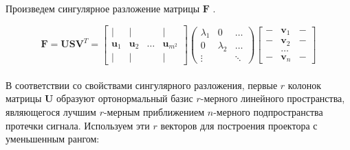 Произведем сингулярное разложение матрицы $\mathbf{F}$ \cite{Golub1996}.

\begin{equation}
    \mathbf{F} = \mathbf{USV}^T
    =
    \begin{bmatrix}
        |            & |            &        & |       \\
        \mathbf{u}_1 & \mathbf{u}_2 & \dots  & \mathbf{u}_{m^2} \\
        |            & |            &        & |
    \end{bmatrix}
    \begin{pmatrix}
        \lambda_1 & 0         & \dots    \\
        0         & \lambda_2 & \dots    \\
        \vdots    &           & \ddots
    \end{pmatrix}
    \begin{bmatrix}
        - & \mathbf{v}_1 & - \\
        - & \mathbf{v}_2 & - \\
          & \dots        &   \\
        - & \mathbf{v}_n & -
    \end{bmatrix}
\end{equation}
\\
В соответствии со свойствами сингулярного разложения, первые $r$ колонок матрицы $\mathbf{U}$
образуют ортонормальный базис $r$-мерного линейного пространства, являющегося лучшим $r$-мерным приближением $n$-мерного
подпространства протечки сигнала. Используем эти $r$ векторов для построения проектора с уменьшенным рангом:

